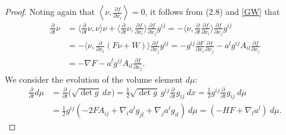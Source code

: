 \documentclass{amsart}
\theoremstyle{definition}
\numberwithin{equation}{section}
\begin{document}
\begin{proof}
Noting again that $\left <\nu, \frac{\partial f}{\partial x_i}\right >=0$, it  follows  from (2.8) and \eqref{GW}   that
\begin{align}
\frac{\partial}{\partial t} \nu &= \langle \frac{\partial}{\partial
t}\nu, \nu \rangle \nu
+\langle \frac{\partial}{\partial
t}\nu, \frac{\partial f}{\partial x_i}\rangle \frac{\partial
f}{\partial x_j}g^{ij}=-\langle \nu, \frac{\partial}{\partial
t}\frac{\partial f}{\partial x_i}\rangle \frac{\partial f}{\partial
x_j}g^{ij}\nonumber\\
&=-\langle \nu, \frac{\partial}{\partial x_i}(F\nu+W)\rangle
\frac{\partial f}{\partial x_j}g^{ij}
=-g^{ij}\frac{\partial F}{\partial x_i} \frac{\partial
f}{\partial x_j}- a^l g^{ij}A_{il}\frac{\partial f}{\partial x_j}\nonumber\\
&=-\nabla F-a^l g^{ij}A_{il}\frac{\partial f}{\partial x_j}.\nonumber
\end{align}
We consider the evolution of the volume element $d\mu$:
\begin{align}\label{dm}
\frac{\partial}{\partial t} d\mu&=\frac{\partial}{\partial t}
\big(\sqrt{\det g}~ dx\big)=\frac{1}{2}{\sqrt{\det g}}~
g^{ij}\frac{\partial}{\partial t}g_{ij}
~dx=\frac{1}{2}g^{ij}\frac{\partial}{\partial t}g_{ij}
~d\mu  \\
&=\frac{1}{2}g^{ij}(-2F A_{ij}+\nabla_i a^l g_{jl}+\nabla_j
a^lg_{il}) ~d\mu=(-HF+\nabla_l a^l)~d\mu.\nonumber
\end{align}



\end{proof}
\end{document}
